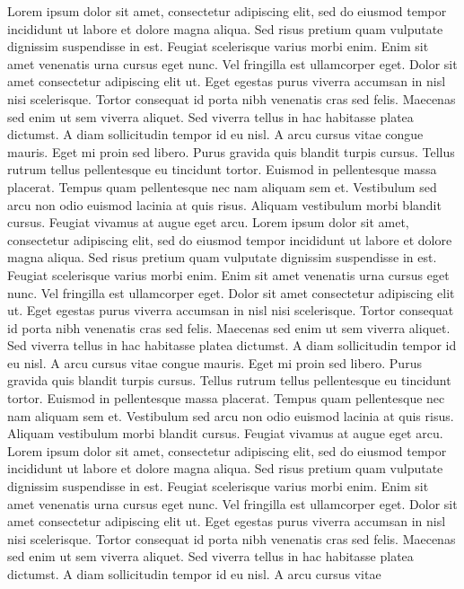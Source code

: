 Lorem
 ipsum dolor sit amet, consectetur adipiscing elit, sed do eiusmod 
tempor incididunt ut labore et dolore magna aliqua. Sed risus pretium 
quam vulputate dignissim suspendisse in est. Feugiat scelerisque varius 
morbi enim. Enim sit amet venenatis urna cursus eget nunc. Vel fringilla
 est ullamcorper eget. Dolor sit amet consectetur adipiscing elit ut. 
Eget egestas purus viverra accumsan in nisl nisi scelerisque. Tortor 
consequat id porta nibh venenatis cras sed felis. Maecenas sed enim ut 
sem viverra aliquet. Sed viverra tellus in hac habitasse platea 
dictumst. A diam sollicitudin tempor id eu nisl. A arcu cursus vitae 
congue mauris. Eget mi proin sed libero. Purus gravida quis blandit 
turpis cursus. Tellus rutrum tellus pellentesque eu tincidunt tortor. 
Euismod in pellentesque massa placerat. Tempus quam pellentesque nec nam
 aliquam sem et. Vestibulum sed arcu non odio euismod lacinia at quis 
risus. Aliquam vestibulum morbi blandit cursus. Feugiat vivamus at augue
 eget arcu.
Lorem
 ipsum dolor sit amet, consectetur adipiscing elit, sed do eiusmod
tempor incididunt ut labore et dolore magna aliqua. Sed risus pretium
quam vulputate dignissim suspendisse in est. Feugiat scelerisque varius
morbi enim. Enim sit amet venenatis urna cursus eget nunc. Vel fringilla
 est ullamcorper eget. Dolor sit amet consectetur adipiscing elit ut.
Eget egestas purus viverra accumsan in nisl nisi scelerisque. Tortor
consequat id porta nibh venenatis cras sed felis. Maecenas sed enim ut
sem viverra aliquet. Sed viverra tellus in hac habitasse platea
dictumst. A diam sollicitudin tempor id eu nisl. A arcu cursus vitae
congue mauris. Eget mi proin sed libero. Purus gravida quis blandit
turpis cursus. Tellus rutrum tellus pellentesque eu tincidunt tortor.
Euismod in pellentesque massa placerat. Tempus quam pellentesque nec nam
 aliquam sem et. Vestibulum sed arcu non odio euismod lacinia at quis
risus. Aliquam vestibulum morbi blandit cursus. Feugiat vivamus at augue
 eget arcu.
Lorem
 ipsum dolor sit amet, consectetur adipiscing elit, sed do eiusmod
tempor incididunt ut labore et dolore magna aliqua. Sed risus pretium
quam vulputate dignissim suspendisse in est. Feugiat scelerisque varius
morbi enim. Enim sit amet venenatis urna cursus eget nunc. Vel fringilla
 est ullamcorper eget. Dolor sit amet consectetur adipiscing elit ut.
Eget egestas purus viverra accumsan in nisl nisi scelerisque. Tortor
consequat id porta nibh venenatis cras sed felis. Maecenas sed enim ut
sem viverra aliquet. Sed viverra tellus in hac habitasse platea
dictumst. A diam sollicitudin tempor id eu nisl. A arcu cursus vitae

